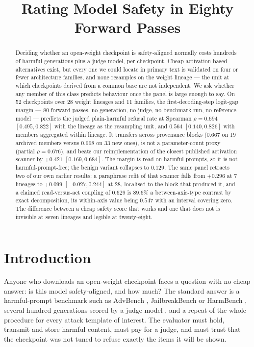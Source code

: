 \documentclass[11pt,letterpaper]{article}
\title{Rating Model Safety in Eighty Forward Passes}
\author{}
\date{}
\begin{document}
\maketitle

\begin{abstract}
Deciding whether an open-weight checkpoint is safety-aligned normally costs hundreds of harmful generations plus a judge model, per checkpoint. Cheap activation-based alternatives exist, but every one we could locate in primary text is validated on four or fewer architecture families, and none resamples on the weight lineage --- the unit at which checkpoints derived from a common base are not independent. We ask whether any member of this class predicts behaviour once the panel is large enough to say. On 52 checkpoints over 28 weight lineages and 11 families, the first-decoding-step logit-gap margin --- 80 forward passes, no generation, no judge, no benchmark run, no reference model --- predicts the judged plain-harmful refusal rate at Spearman $\rho = 0.694$ $[0.495, 0.822]$ with the lineage as the resampling unit, and $0.564$ $[0.140, 0.826]$ with members aggregated within lineage. It transfers across provenance blocks ($0.667$ on 19 archived members versus $0.668$ on 33 new ones), is not a parameter-count proxy (partial $\rho = 0.676$), and beats our reimplementation of the closest published activation scanner by $+0.421$ $[0.169, 0.684]$. The margin is read on harmful prompts, so it is not harmful-prompt-free; the benign variant collapses to $0.129$. The same panel retracts two of our own earlier results: a paraphrase refit of that scanner falls from $+0.296$ at 7 lineages to $+0.099$ $[-0.027, 0.244]$ at 28, localised to the block that produced it, and a claimed read-versus-act coupling of $0.629$ is 89.6\% a between-axis-type contrast by exact decomposition, its within-axis value being $0.547$ with an interval covering zero. The difference between a cheap safety score that works and one that does not is invisible at seven lineages and legible at twenty-eight.
\end{abstract}

\section{Introduction}

Anyone who downloads an open-weight checkpoint faces a question with no cheap answer: is this model safety-aligned, and how much? The standard answer is a harmful-prompt benchmark such as AdvBench \citep{Zou2023}, JailbreakBench \citep{Chao2024} or HarmBench \citep{Mazeika2024}, several hundred generations scored by a judge model \citep{Zheng2023}, and a repeat of the whole procedure for every attack template of interest. The evaluator must hold, transmit and store harmful content, must pay for a judge, and must trust that the checkpoint was not tuned to refuse exactly the items it will be shown.
\end{document}
